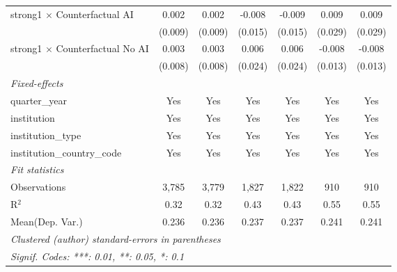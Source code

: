 \begin{tabular}{lcccccc}
   strong1 $\times$ Counterfactual AI     & 0.002       & 0.002       & -0.008  & -0.009  & 0.009   & 0.009\\   
                                          & (0.009)     & (0.009)     & (0.015) & (0.015) & (0.029) & (0.029)\\   
   strong1 $\times$ Counterfactual No AI  & 0.003       & 0.003       & 0.006   & 0.006   & -0.008  & -0.008\\   
                                          & (0.008)     & (0.008)     & (0.024) & (0.024) & (0.013) & (0.013)\\   
   \midrule
   \emph{Fixed-effects}\\
   quarter\_year                          & Yes         & Yes         & Yes     & Yes     & Yes     & Yes\\  
   institution                            & Yes         & Yes         & Yes     & Yes     & Yes     & Yes\\  
   institution\_type                      & Yes         & Yes         & Yes     & Yes     & Yes     & Yes\\  
   institution\_country\_code             & Yes         & Yes         & Yes     & Yes     & Yes     & Yes\\  
   \midrule
   \emph{Fit statistics}\\
   Observations                           & 3,785       & 3,779       & 1,827   & 1,822   & 910     & 910\\  
   R$^2$                                  & 0.32        & 0.32        & 0.43    & 0.43    & 0.55    & 0.55\\  
Mean(Dep. Var.) & 0.236 & 0.236 & 0.237 & 0.237 & 0.241 & 0.241 \\
   \midrule \midrule
   \multicolumn{7}{l}{\emph{Clustered (author) standard-errors in parentheses}}\\
   \multicolumn{7}{l}{\emph{Signif. Codes: ***: 0.01, **: 0.05, *: 0.1}}\\
\end{tabular}
\par\endgroup
